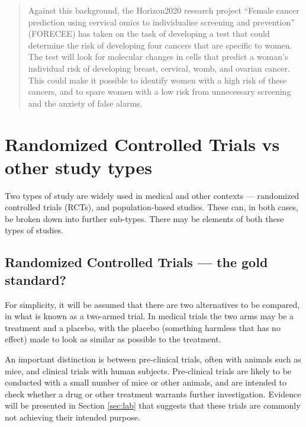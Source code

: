 \documentclass[
  10pt,
  b5paper]{book}
\begin{document}
\begin{quote}
Against this background, the Horizon2020 research project ``Female
cancer prediction using cervical omics to individualise screening and
prevention'' (FORECEE) has taken on the task of developing a test that
could determine the risk of developing four cancers that are specific
to women. The test will look for molecular changes in cells that
predict a woman's individual risk of developing breast, cervical,
womb, and ovarian cancer. This could make it possible to identify
women with a high risk of these cancers, and to spare women with a low
risk from unnecessary screening and the anxiety of false alarms.
\end{quote}

\hypertarget{ss:rct}{%
\section{Randomized Controlled Trials vs other study types}\label{ss:rct}}

Two types of study are widely used in medical and other contexts ---
randomized controlled trials (RCTs), and population-based studies. These
can, in both cases, be broken down into further sub-types. There may be
elements of both these types of studies.

\hypertarget{randomized-controlled-trials-the-gold-standard}{%
\subsection*{Randomized Controlled Trials --- the gold standard?}\label{randomized-controlled-trials-the-gold-standard}}

For simplicity, it will be assumed that there are two alternatives to be
compared, in what is known as a two-armed trial. In medical trials the
two arms may be a treatment and a placebo, with the placebo (something
harmless that has no effect) made to look as similar as possible to the
treatment.

An important distinction is between pre-clinical trials, often with
animals such as mice, and clinical trials with human subjects.
Pre-clinical trials are likely to be conducted with a small number of
mice or other animals, and are intended to check whether a drug or other
treatment warrants further investigation. Evidence will be presented in
Section \ref{sec:lab} that suggests that these trials are commonly not
achieving their intended purpose.
\end{document}
